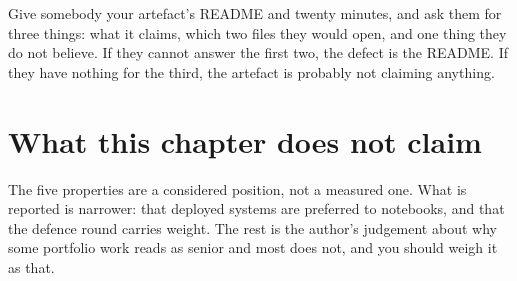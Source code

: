 \begin{drill}
Give somebody your artefact's README and twenty minutes, and ask them for three
things: what it claims, which two files they would open, and one thing they do
not believe. If they cannot answer the first two, the defect is the README. If
they have nothing for the third, the artefact is probably not claiming anything.
\end{drill}

\section*{What this chapter does not claim}

The five properties are a considered position, not a measured one. What is
reported is narrower: that deployed systems are preferred to notebooks, and
that the defence round carries weight. The rest is the author's judgement about
why some portfolio work reads as senior and most does not, and you should weigh
it as that.
